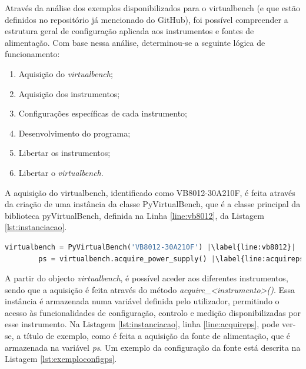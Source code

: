 Através da análise dos exemplos disponibilizados para o \acrshort{virtualbench} (e que estão definidos no repositório já mencionado do GitHub), foi possível compreender a estrutura geral de configuração aplicada aos instrumentos e fontes de alimentação. Com base nessa análise, determinou-se a seguinte lógica de funcionamento:

\begin{enumerate}
	\label{item:logica}
	\item Aquisição do \textit{virtualbench};
	\item Aquisição dos instrumentos;
	\item Configurações específicas de cada instrumento;
	\item Desenvolvimento do programa;
	\item Libertar os instrumentos;
	\item Libertar o \textit{virtualbench}.
\end{enumerate}

A aquisição do \acrshort{virtualbench}, identificado como VB8012-30A210F, é feita através da criação de uma instância da classe PyVirtualBench, que é a classe principal da biblioteca pyVirtualBench, definida na Linha \ref{line:vb8012}, da Listagem \ref{lst:instanciacao}.

\begin{center}
\begin{minipage}{0.9\linewidth}
	\begin{lstlisting}[language=Python,escapechar=|, caption=Instanciação da classe PyVirtualBench, label=lst:instanciacao]
		virtualbench = PyVirtualBench('VB8012-30A210F') |\label{line:vb8012}|
		ps = virtualbench.acquire_power_supply() |\label{line:acquireps}|
	\end{lstlisting}
\end{minipage}
\end{center}

A partir do objecto \textit{virtualbench}, é possível aceder aos diferentes instrumentos, sendo que a aquisição é feita através do método \textit{acquire\_\textless instrumento\textgreater()}. Essa instância é armazenada numa variável definida pelo utilizador, permitindo o acesso às funcionalidades de configuração, controlo e medição disponibilizadas por esse instrumento. Na Listagem \ref{lst:instanciacao}, linha \ref{line:acquireps}, pode ver-se, a título de exemplo, como é feita a aquisição da fonte de alimentação, que é armazenada na variável \textit{ps}. Um exemplo da configuração da fonte está descrita na Listagem \ref{lst:exemploconfigps}.

